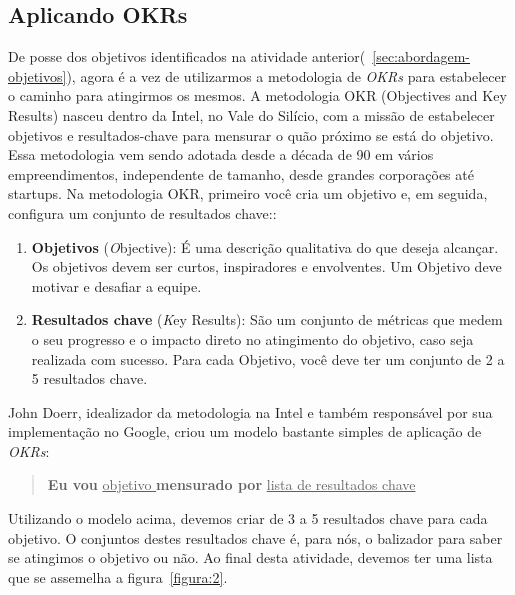 \documentclass[10pt]{article}
\begin{document}
        \subsection{Aplicando OKRs}\label{sec:abordagem-como-okr}
            
            De posse dos objetivos identificados na atividade anterior(~\ref{sec:abordagem-objetivos}), agora é a vez de utilizarmos a metodologia de \textit{OKRs} para estabelecer o caminho para atingirmos os mesmos. A metodologia OKR (Objectives and Key Results) nasceu dentro da Intel, no Vale do Silício, com a missão de estabelecer objetivos e resultados-chave para mensurar o quão próximo se está do objetivo. Essa metodologia vem sendo adotada desde a década de 90 em vários empreendimentos, independente de tamanho, desde grandes corporações até startups.\cite{OKR:Castro-1} Na metodologia OKR, primeiro você cria um objetivo e, em seguida, configura um conjunto de resultados chave:\cite{OKR:Castro-2}: 
            \begin{enumerate}
                \item \textbf{Objetivos} (\textit Objective): É uma descrição qualitativa do que deseja alcançar. Os objetivos devem ser curtos, inspiradores e envolventes. Um Objetivo deve motivar e desafiar a equipe.
                \item \textbf{Resultados chave} (\textit Key Results): São um conjunto de métricas que medem o seu progresso e o impacto direto no atingimento do objetivo, caso seja realizada com sucesso. Para cada Objetivo, você deve ter um conjunto de 2 a 5 resultados chave.
            \end{enumerate}
                
            John Doerr, idealizador da metodologia na Intel e também responsável por sua implementação no Google, criou um modelo bastante simples de aplicação de  \textit{OKRs}:\cite{OKR:John}
            \begin{quote}
            \centering
                \textbf{Eu vou} \underline{ objetivo } \textbf{mensurado por} \underline{ lista de resultados chave}
            \end{quote}
            
            Utilizando o modelo acima, devemos criar de 3 a 5 resultados chave para cada objetivo. O conjuntos destes resultados chave é, para nós, o balizador para saber se atingimos o objetivo ou não. Ao final desta atividade, devemos ter uma lista que se assemelha a figura~\ref{figura:2}.
            
\end{document}
